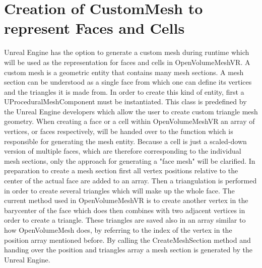 \documentclass{report}
\begin{document}
	\section{Creation of CustomMesh to represent Faces and Cells} \label{CustomMesh}
	\startsection
		Unreal Engine has the option to generate a custom mesh during runtime which will be used as the representation for faces and cells in OpenVolumeMeshVR. A custom mesh is a geometric entity that contains many mesh sections. A mesh section can be understood as a single face from which one can define its vertices and the triangles it is made from. In order to create this kind of entity, first a UProceduralMeshComponent must be instantiated. This class is predefined by the Unreal Engine developers which allow the user to create custom triangle mesh geometry. When creating a face or a cell within OpenVolumeMeshVR an array of vertices, or faces respectively, will be handed over to the function which is responsible for generating the mesh entity. Because a cell is just a scaled-down version of multiple faces, which are therefore corresponding to the individual mesh sections, only the approach for generating a "face mesh" will be clarified. In preparation to create a mesh section first all vertex positions relative to the center of the actual face are added to an array. Then a triangulation is performed in order to create several triangles which will make up the whole face. The current method used in OpenVolumeMeshVR is to create another vertex in the barycenter of the face which does then combines with two adjacent vertices in order to create a triangle. These triangles are saved also in an array similar to how OpenVolumeMesh does, by referring to the index of the vertex in the position array mentioned before. By calling the CreateMeshSection method and handing over the position and triangles array a mesh section is generated by the Unreal Engine.
	\closesection
	
\end{document}
